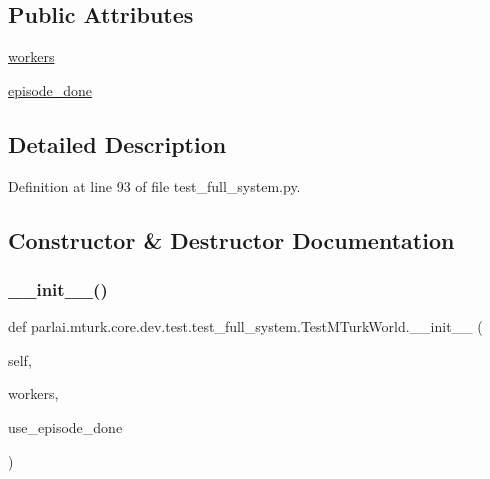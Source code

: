 \subsection*{Public Attributes}
\begin{DoxyCompactItemize}
\item 
\hyperlink{classparlai_1_1mturk_1_1core_1_1dev_1_1test_1_1test__full__system_1_1TestMTurkWorld_abc8cda139731454801c07fcfec2a36b2}{workers}
\item 
\hyperlink{classparlai_1_1mturk_1_1core_1_1dev_1_1test_1_1test__full__system_1_1TestMTurkWorld_a2a95e6618784cdab5f276f557bfee83e}{episode\+\_\+done}
\end{DoxyCompactItemize}


\subsection{Detailed Description}


Definition at line 93 of file test\+\_\+full\+\_\+system.\+py.



\subsection{Constructor \& Destructor Documentation}
\mbox{\label{classparlai_1_1mturk_1_1core_1_1dev_1_1test_1_1test__full__system_1_1TestMTurkWorld_a8f1fd9499cb38bca0fbb4711b047e47b}} 
\subsubsection{\texorpdfstring{\+\_\+\+\_\+init\+\_\+\+\_\+()}{\_\_init\_\_()}}
{\footnotesize\ttfamily def parlai.\+mturk.\+core.\+dev.\+test.\+test\+\_\+full\+\_\+system.\+Test\+M\+Turk\+World.\+\_\+\+\_\+init\+\_\+\+\_\+ (\begin{DoxyParamCaption}\item[{}]{self,  }\item[{}]{workers,  }\item[{}]{use\+\_\+episode\+\_\+done }\end{DoxyParamCaption})}



